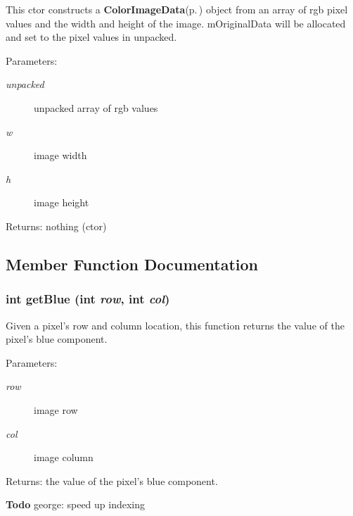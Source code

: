 This ctor constructs a {\bf Color\-Image\-Data}{\rm (p.\,\pageref{class_c_s_image_viewer_1_1_color_image_data})} object from an array of rgb pixel values and the width and height of the image. m\-Original\-Data will be allocated and set to the pixel values in unpacked. 

\begin{Desc}
\item[Parameters:]
\begin{description}
\item[{\em unpacked}]unpacked array of rgb values \item[{\em w}]image width \item[{\em h}]image height \end{description}
\end{Desc}
\begin{Desc}
\item[Returns:]nothing (ctor) \end{Desc}


\subsection{Member Function Documentation}
\subsubsection{\setlength{\rightskip}{0pt plus 5cm}int get\-Blue (int {\em row}, int {\em col})}\label{class_c_s_image_viewer_1_1_color_image_data_2d270d661f5cfa7d4be1e66701b55376}


Given a pixel's row and column location, this function returns the value of the pixel's blue component. 

\begin{Desc}
\item[Parameters:]
\begin{description}
\item[{\em row}]image row \item[{\em col}]image column \end{description}
\end{Desc}
\begin{Desc}
\item[Returns:]the value of the pixel's blue component.\end{Desc}
\begin{Desc}
\item[{\bf Todo}]george: speed up indexing \end{Desc}
